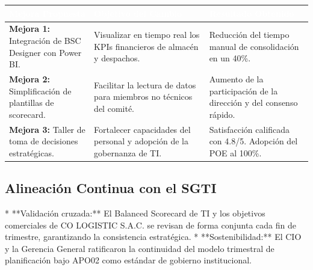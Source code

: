 \documentclass[11pt]{article}
\newcounter{none} %
\begin{document}
\vspace{0.3cm}
\setlength{\tabcolsep}{5pt}
\renewcommand{\arraystretch}{1.5}
{\def\LTcaptype{none}
\begin{longtable}[]{@{}
  >{\raggedright\arraybackslash}p{0.28\linewidth}
  >{\raggedright\arraybackslash}p{0.38\linewidth}
  >{\raggedright\arraybackslash}p{0.34\linewidth}@{}}
\rowcolor{DeepNavy}
\textcolor{white}{\textbf{Mejora Propuesta}} & \textcolor{white}{\textbf{Objetivo del Cambio}} & \textcolor{white}{\textbf{Resultado Obtenido}} \\ \hline
\endhead
\rowcolor{LightGray}
\textbf{Mejora 1:} Integración de BSC Designer con Power BI. & Visualizar en tiempo real los KPIs financieros de almacén y despachos. & Reducción del tiempo manual de consolidación en un 40\%. \\ \hline
\textbf{Mejora 2:} Simplificación de plantillas de scorecard. & Facilitar la lectura de datos para miembros no técnicos del comité. & Aumento de la participación de la dirección y del consenso rápido. \\ \hline
\rowcolor{LightGray}
\textbf{Mejora 3:} Taller de toma de decisiones estratégicas. & Fortalecer capacidades del personal y adopción de la gobernanza de TI. & Satisfacción calificada con 4.8/5. Adopción del POE al 100\%. \\ \hline
\end{longtable}
}

\subsection{Alineación Continua con el SGTI}
* **Validación cruzada:** El Balanced Scorecard de TI y los objetivos comerciales de CO LOGISTIC S.A.C. se revisan de forma conjunta cada fin de trimestre, garantizando la consistencia estratégica.
* **Sostenibilidad:** El CIO y la Gerencia General ratificaron la continuidad del modelo trimestral de planificación bajo APO02 como estándar de gobierno institucional.
\end{document}
